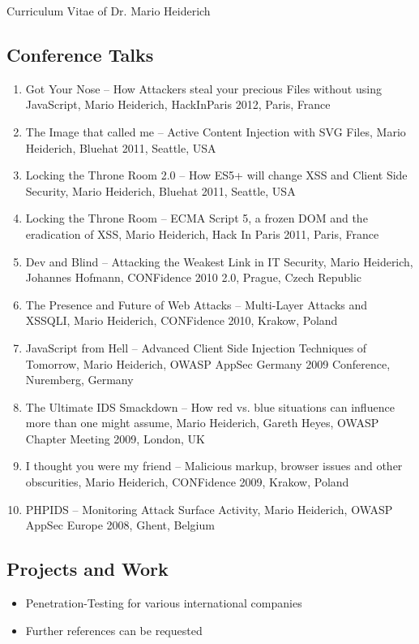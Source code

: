 \begin{cv}{Curriculum Vitae of Dr. Mario Heiderich}
\subsection*{Conference Talks}
\begin{enumerate}
  \item Got Your Nose -- How Attackers steal your precious Files without using JavaScript, Mario Heiderich, HackInParis 2012, Paris, France
  \item The Image that called me -- Active Content Injection with SVG Files, Mario Heiderich, Bluehat 2011, Seattle, USA
  \item Locking the Throne Room 2.0 -- How ES5+ will change XSS and Client Side Security, Mario Heiderich, Bluehat 2011, Seattle, USA
  \item Locking the Throne Room -- ECMA Script 5, a frozen DOM and the eradication of XSS, Mario Heiderich, Hack In Paris 2011, Paris, France
  \item Dev and Blind -- Attacking the Weakest Link in IT Security, Mario Heiderich, Johannes Hofmann, CONFidence 2010 2.0, Prague, Czech Republic
  \item The Presence and Future of Web Attacks -- Multi-Layer Attacks and XSSQLI, Mario Heiderich, CONFidence 2010, Krakow, Poland
  \item JavaScript from Hell -- Advanced Client Side Injection Techniques of Tomorrow, Mario Heiderich, OWASP AppSec Germany 2009 Conference, Nuremberg, Germany
  \item The Ultimate IDS Smackdown -- How red vs. blue situations can influence more than one might assume, Mario Heiderich, Gareth Heyes, OWASP Chapter Meeting 2009, London, UK
  \item I thought you were my friend -- Malicious markup, browser issues and other obscurities, Mario Heiderich, CONFidence 2009, Krakow, Poland
  \item PHPIDS -- Monitoring Attack Surface Activity, Mario Heiderich, OWASP AppSec Europe 2008, Ghent, Belgium
\end{enumerate}

\subsection*{Projects and Work}
\begin{itemize}
  \item Penetration-Testing for various international companies
  \item Further references can be requested
\end{itemize}


\end{cv}
